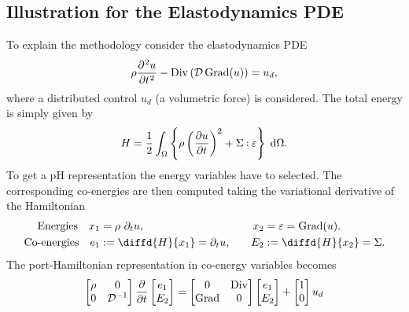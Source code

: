 \subsection{Illustration for the Elastodynamics PDE}
To explain the methodology consider the elastodynamics PDE
\begin{equation*}
\rho \diffp[2]{u}{t} - \Div\left(\mathcal{D} \Grad(u)\right) = u_d,
\end{equation*}
where a distributed control $u_d$ (a volumetric force) is considered.
The total energy is simply given by 
\[\displaystyle H = \frac{1}{2} \int_{\Omega} \left\{\rho \left(\diffp{u}{t}\right)^2 + \Sigma \cddot \varepsilon \right\} \d{\Omega}.
\]
To get a pH representation the energy variables have to selected. The corresponding co-energies are then computed taking the variational derivative of the Hamiltonian
\begin{equation}
\begin{aligned}
\text{Energies} \quad  x_1 &= \rho \ \partial_t {u}, \\
\text{Co-energies} \quad e_1 &:= \diffd{H}{x_1} =  \partial_t {u}, \\
\end{aligned} \qquad
\begin{aligned}
x_2 &= \varepsilon = \Grad(u). \\
E_2 &:= \diffd{H}{x_2} = \Sigma.
\end{aligned}
\end{equation}
The port-Hamiltonian representation in co-energy variables becomes
\begin{equation*}
\begin{bmatrix}
\rho & 0 \\ 0 & \mathcal{D}^{-1} \\
\end{bmatrix}
\diffp{}{t}
\begin{bmatrix}
e_1 \\ E_2 \\
\end{bmatrix} = 
\begin{bmatrix}
0 & \Div \\ \Grad & 0 \\
\end{bmatrix}
\begin{bmatrix}
e_1 \\ E_2 \\
\end{bmatrix} + 
\begin{bmatrix}
1 \\ 0 \\
\end{bmatrix} u_d 
\end{equation*}
